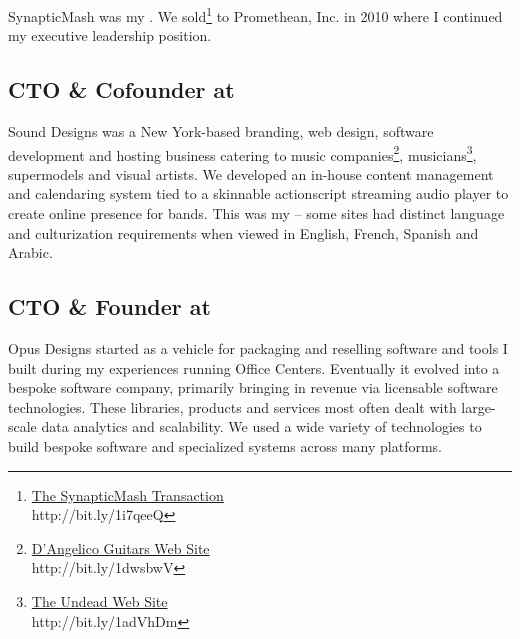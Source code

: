 SynapticMash was my .  We sold\footnote{\href{http://www.inc.com/news/articles/2010/07/synapticmash-acquired-by-promethean.html}{The SynapticMash Transaction}\\ http://bit.ly/1i7qeeQ} to Promethean, Inc. in 2010 where I continued my executive leadership position.

\subsection{\textbf{CTO \& Cofounder} at  \shyears{[2006-2008]}}
Sound Designs was a New York-based branding, web design, software development and hosting business catering to music companies\footnote{\href{https://web.archive.org/web/20060215201617/http://www.dangelicoguitars.com/guitars.php?}{D'Angelico Guitars Web Site}\\ http://bit.ly/1dwsbwV}, musicians\footnote{\href{https://web.archive.org/web/20070616015006/http://undeadpunk.com/}{The Undead Web Site}\\ http://bit.ly/1adVhDm}, supermodels and visual artists.  We developed an in-house content management and calendaring system tied to a skinnable actionscript streaming audio player to create online presence for bands.  This was my -- some sites had distinct language and culturization requirements when viewed in English, French, Spanish and Arabic.

\subsection{\textbf{CTO \& Founder} at  \shyears{[1997-2008]}}
Opus Designs started as a vehicle for packaging and reselling software and tools I built during my experiences running Office Centers.  Eventually it evolved into a bespoke software company, primarily bringing in revenue via licensable software technologies.  These libraries, products and services most often dealt with large-scale data analytics and scalability.  We used a wide variety of technologies to build bespoke software and specialized systems across many platforms.

